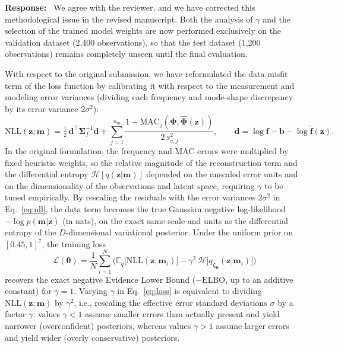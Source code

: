 \documentclass[11pt]{article}
\newenvironment{response}{\par\smallskip\noindent\color{resp}\textbf{Response:}\ }{\par}
\newcommand{\m}{\mathbf{m}}
\newcommand{\z}{\mathbf{z}}
\newcommand{\f}{\mathbf{f}}
\begin{document}
\begin{response}
We agree with the reviewer, and we have corrected this methodological issue in the revised manuscript. Both the
analysis of $\gamma$ and the selection of the trained model weights are now performed exclusively on the validation
dataset (2,400 observations), so that the test dataset (1,200 observations) remains completely unseen until the final
evaluation.

With respect to the original submission, we have reformulated the data-misfit term of the loss function by calibrating
it with respect to the measurement and modeling error variances (dividing each frequency and mode-shape discrepancy by
its error variance $2\sigma^2$):
\begin{equation}
\mathrm{NLL}(\z;\m)=\tfrac12\,\mathbf{d}^{\top}\bm{\Sigma}_f^{-1}\mathbf{d}
+\sum_{j=1}^{n_m}\frac{1-\mathrm{MAC}_j(\bm{\Phi},\hat{\bm{\Phi}}(\z))}{2\,s_{v,j}^2},\qquad
\mathbf{d}=\log\f-\mathbf{b}-\log\hat{\f}(\z).
\label{eq:nll}
\end{equation}
In the original formulation, the frequency and MAC errors were multiplied by fixed heuristic weights, so the relative
magnitude of the reconstruction term and the differential entropy $\mathcal{H}[q(\z|\m)]$ depended on the unscaled error
units and on the dimensionality of the observations and latent space, requiring $\gamma$ to be tuned empirically. By
rescaling the residuals with the error variances $2\sigma^2$ in Eq.~\eqref{eq:nll}, the data term becomes the true
Gaussian negative log-likelihood $-\log p(\m|\z)$ (in nats), on the exact same scale and units as the differential
entropy of the $D$-dimensional variational posterior. Under the uniform prior on $[0.45,1]^7$, the training loss
\begin{equation}
\mathcal{L}(\bm\theta)=\frac1N\sum_{i=1}^N\Big(\mathbb{E}_{q}\big[\mathrm{NLL}(\z;\m_i)\big]
-\gamma^2\,\mathcal{H}\big[q_{\bm\zeta_{\bm\theta}}(\z|\m_i)\big]\Big)
\label{eq:loss}
\end{equation}
recovers the exact negative Evidence Lower Bound ($-\mathrm{ELBO}$, up to an additive constant) for $\gamma=1$. Varying
$\gamma$ in Eq.~\eqref{eq:loss} is equivalent to dividing $\mathrm{NLL}(\z;\m)$ by $\gamma^2$, i.e., rescaling the
effective error standard deviations $\sigma$ by a factor $\gamma$: values $\gamma<1$ assume smaller errors than actually
present and yield narrower (overconfident) posteriors, whereas values $\gamma>1$ assume larger errors and yield wider
(overly conservative) posteriors.


\end{response}
\end{document}
